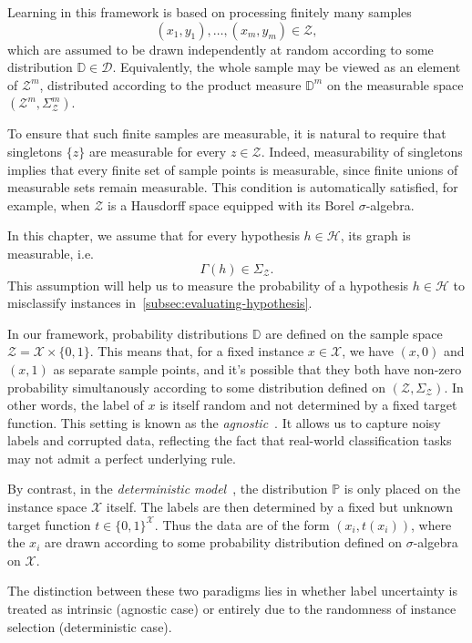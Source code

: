 \medskip

Learning in this framework is based on processing finitely many samples
\[
    (x_1,y_1),\dots,(x_m,y_m) \in \mathcal{Z},
\]
which are assumed to be drawn independently at random according to some distribution $\mathbb{D} \in \mathcal{D}$.
Equivalently, the whole sample may be viewed as an element of $\mathcal{Z}^m$, distributed according to the product measure $\mathbb{D}^m$ on the measurable space $(\mathcal{Z}^m,\Sigma_{\mathcal{Z}}^m)$.

To ensure that such finite samples are measurable, it is natural to require that singletons $\{z\}$ are measurable for every $z \in \mathcal{Z}$. Indeed, measurability of singletons implies that every finite set of sample points is measurable, since finite unions of measurable sets remain measurable. This condition is automatically satisfied, for example, when $\mathcal{Z}$ is a Hausdorff space equipped with its Borel $\sigma$-algebra.

\begin{remark}
    \label{rem:hyposthesis-is-measurable}
    In this chapter, we assume that for every hypothesis $h \in \mathcal{H}$, its graph is measurable, i.e.
    \[
        \Gamma(h) \in \Sigma_{\mathcal{Z}}.
    \]
    This assumption will help us to measure the probability of a hypothesis $h \in \mathcal{H}$ to misclassify instances in~\ref{subsec:evaluating-hypothesis}.
\end{remark}

\begin{remarknl}
    In our framework, probability distributions $\mathbb{D}$ are defined on the sample space $\mathcal{Z} = \mathcal{X}\times\{0,1\}$.
    This means that, for a fixed instance $x \in \mathcal{X}$, we have $(x,0)$ and $(x,1)$ as separate sample points, and it's possible that they both have non-zero probability simultanously according to some distribution defined on $(\mathcal{Z}, \Sigma_{\mathcal{Z}})$.
    In other words, the label of $x$ is itself random and not determined by a fixed target function.
    This setting is known as the \emph{agnostic}~\cite[p.45, \S 3.2.1]{UnderstandinMachineLearning}.
    It allows us to capture noisy labels and corrupted data, reflecting the fact that real-world classification tasks may not admit a perfect underlying rule.

    By contrast, in the \emph{deterministic model}~\cite{LearnabilityDeterministic}, the distribution $\mathbb{P}$ is only placed on the instance space $\mathcal{X}$ itself.
    The labels are then determined by a fixed but unknown target function $t \in \{0,1\}^\mathcal{X}$.
    Thus the data are of the form $(x_i,t(x_i))$, where the $x_i$ are drawn according to some probability distribution defined on $\sigma$-algebra on $\mathcal{X}$.

    The distinction between these two paradigms lies in whether label uncertainty is treated as intrinsic (agnostic case) or entirely due to the randomness of instance selection (deterministic case).
\end{remarknl}

